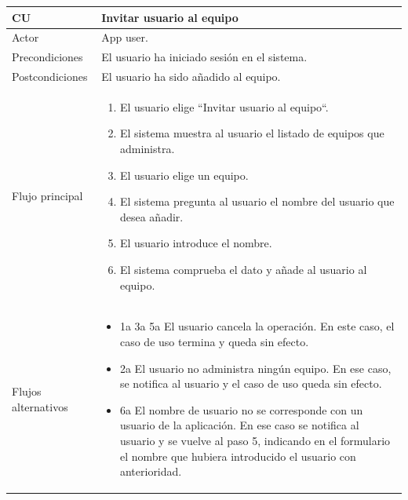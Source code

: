 \documentclass[twoside]{report}
\newcommand\addrow[2]{#1 &#2\\ }
\newcommand\addheading[2]{#1 &#2\\ \hline}
\newcommand\tabularhead{\begin{tabular}{lp{0.7\textwidth}}
\hline
}
\newenvironment{usecase}{\tabularhead}
{\hline\end{tabular}}
\begin{document}
\begin{usecase}
  \addheading{\textbf{CU\arabic{usecase}}}{Invitar usuario al equipo} 
  \addrow{Actor}{App user.}
  \addrow{Precondiciones}{El usuario ha iniciado sesión en el sistema.}
  \addrow{Postcondiciones}{El usuario ha sido añadido al equipo.}
  \addrow{Flujo principal}{
  		\begin{enumerate}
  		\item El usuario elige “Invitar usuario al equipo“. %
  		\item El sistema muestra al usuario el listado de equipos que administra. %
  		\item El usuario elige un equipo. %
  		\item El sistema pregunta al usuario el nombre del usuario que desea añadir. %
  		\item El usuario introduce el nombre. %
  		\item El sistema comprueba el dato y añade al usuario al equipo. %
  		\end{enumerate}
  }
  \addrow{Flujos alternativos}{
  		\begin{itemize}
  		\item 1a 3a 5a El usuario cancela la operación. En este caso, el caso de uso termina y queda sin efecto.
  		\item 2a El usuario no administra ningún equipo. En ese caso, se notifica al usuario y el caso de uso queda sin efecto.
  		\item 6a El nombre de usuario no se corresponde con un usuario de la aplicación. En ese caso se notifica al usuario y se vuelve al paso 5, indicando en el formulario el nombre que hubiera introducido el usuario con anterioridad.
  		\end{itemize}
  }
\end{usecase}\\

\vspace{0.5cm}
\end{document}

